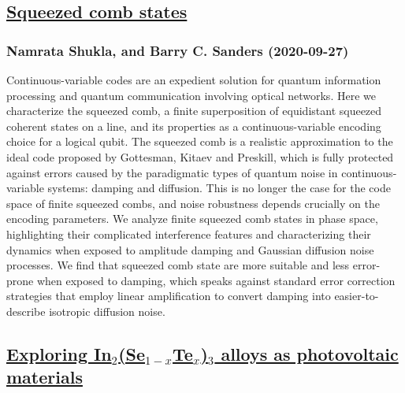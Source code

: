 \subsection*{\href{http://arxiv.org/abs/2009.12888v1}{Squeezed comb states}}
\subsubsection*{Namrata Shukla, and Barry C. Sanders (2020-09-27)}
Continuous-variable codes are an expedient solution for quantum information
processing and quantum communication involving optical networks. Here we
characterize the squeezed comb, a finite superposition of equidistant squeezed
coherent states on a line, and its properties as a continuous-variable encoding
choice for a logical qubit. The squeezed comb is a realistic approximation to
the ideal code proposed by Gottesman, Kitaev and Preskill, which is fully
protected against errors caused by the paradigmatic types of quantum noise in
continuous-variable systems: damping and diffusion. This is no longer the case
for the code space of finite squeezed combs, and noise robustness depends
crucially on the encoding parameters. We analyze finite squeezed comb states in
phase space, highlighting their complicated interference features and
characterizing their dynamics when exposed to amplitude damping and Gaussian
diffusion noise processes. We find that squeezed comb state are more suitable
and less error-prone when exposed to damping, which speaks against standard
error correction strategies that employ linear amplification to convert damping
into easier-to-describe isotropic diffusion noise.

\subsection*{\href{http://arxiv.org/abs/2009.12885v2}{Exploring In$_2$(Se$_{1-x}$Te$_x$)$_3$ alloys as photovoltaic materials}}

